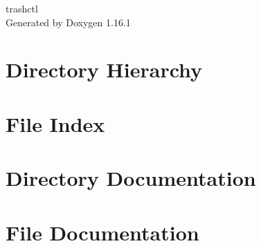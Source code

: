 \documentclass[twoside]{book}
\newcommand{\+}{\discretionary{\mbox{\scriptsize$\hookleftarrow$}}{}{}}
\newcommand{\clearemptydoublepage}{%
    \newpage{\pagestyle{empty}\cleardoublepage}%
  }
\begin{document}
  \raggedbottom
    \hypersetup{pageanchor=false,
                bookmarksnumbered=true,
                pdfencoding=unicode
               }
  \begin{titlepage}
  \vspace*{7cm}
  \begin{center}%
  {\Large trashctl}\\
  \vspace*{1cm}
  {\large Generated by Doxygen 1.16.1}\\
  \end{center}
  \end{titlepage}
  \clearemptydoublepage
  \tableofcontents
  \clearemptydoublepage
  \hypersetup{pageanchor=true}
\chapter{Directory Hierarchy}

\chapter{File Index}

\chapter{Directory Documentation}

\chapter{File Documentation}







  \backmatter
  \newpage
  \clearemptydoublepage
  \printindex
\end{document}
